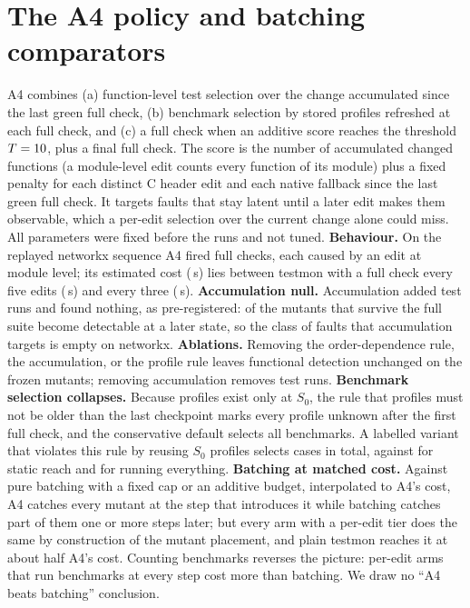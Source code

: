 \section{The A4 policy and batching comparators}
\label{app:a4}
A4 combines (a) function-level test selection over the change accumulated since the last green full check, (b) benchmark selection by stored profiles refreshed at each full check, and (c) a full check when an additive score reaches the threshold $T=10$, plus a final full check.
The score is the number of accumulated changed functions (a module-level edit counts every function of its module) plus a fixed penalty for each distinct C header edit and each native fallback since the last green full check.
It targets faults that stay latent until a later edit makes them observable, which a per-edit selection over the current change alone could miss.
All parameters were fixed before the runs and not tuned.
\textbf{Behaviour.} On the replayed networkx sequence A4 fired \AFourChecks{} full checks, each caused by an edit at module level; its estimated cost (\EstAFour\,s) lies between testmon with a full check every five edits (\EstTestmonKFive\,s) and every three (\EstTestmonKThree\,s).
\textbf{Accumulation null.} Accumulation added \AccumExtraRuns{} test runs and found nothing, as pre-registered: \LatentFound{} of the \MutantsSurvive{} mutants that survive the full suite become detectable at a later state, so the class of faults that accumulation targets is empty on networkx.
\textbf{Ablations.} Removing the order-dependence rule, the accumulation, or the profile rule leaves functional detection unchanged on the frozen mutants; removing accumulation removes \AccumExtraRuns{} test runs.
\textbf{Benchmark selection collapses.} Because profiles exist only at $S_0$, the rule that profiles must not be older than the last checkpoint marks every profile unknown after the first full check, and the conservative default selects all benchmarks. A labelled variant that violates this rule by reusing $S_0$ profiles selects \BTwoVariant{} cases in total, against \BTwoStatic{} for static reach and \BTwoFull{} for running everything.
\textbf{Batching at matched cost.} Against pure batching with a fixed cap or an additive budget, interpolated to A4's cost, A4 catches every mutant at the step that introduces it while batching catches part of them one or more steps later; but every arm with a per-edit tier does the same by construction of the mutant placement, and plain testmon reaches it at about half A4's cost. Counting benchmarks reverses the picture: per-edit arms that run benchmarks at every step cost more than batching. We draw no ``A4 beats batching'' conclusion.

